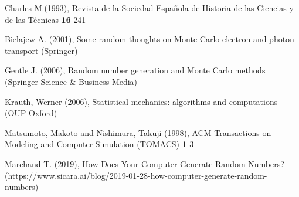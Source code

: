 \documentclass{rbf}
\begin{document}
\begin{thebibliography}

Charles M.(1993), Revista de la Sociedad Espa{\~n}ola de Historia de las Ciencias y de las T{\'e}cnicas {\bf 16} 241

Bielajew A. (2001), Some random thoughts on Monte Carlo electron and photon transport (Springer)

Gentle J. (2006), Random number generation and Monte Carlo methods (Springer Science \& Business Media)

Krauth, Werner (2006), Statistical mechanics: algorithms and computations (OUP Oxford)

Matsumoto, Makoto and Nishimura, Takuji (1998), ACM Transactions on Modeling and Computer Simulation (TOMACS) {\bf 1} 3

Marchand T. (2019), How Does Your Computer Generate Random Numbers? (https://www.sicara.ai/blog/2019-01-28-how-computer-generate-random-numbers)

\end{thebibliography}
\end{document}
